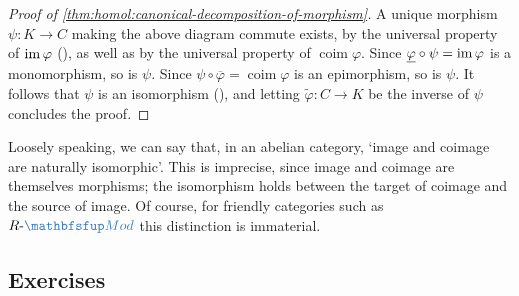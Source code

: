 \begin{proof}[Proof of \cref{thm:homol:canonical-decomposition-of-morphism}]
  A unique morphism $\psi : K \to C$ making the above diagram commute
  exists, by the universal property of $\operatorname{im}\varphi$
  (), as well as by the universal property of
  $\operatorname{coim}\varphi$. Since
  $\underline{\varphi} \circ \psi = \operatorname{im}\varphi$ is a monomorphism,
  so is $\psi$. Since
  $\psi \circ \overline{\varphi} = \operatorname{coim}\varphi$ is an
  epimorphism, so is $\psi$. It follows that $\psi$ is an isomorphism
  (), and letting $\tilde{\varphi} : C \to K$ be
  the inverse of $\psi$ concludes the proof.
\end{proof}
Loosely speaking, we can say that, in an abelian category, `image and
coimage are naturally isomorphic'. This is imprecise, since image and
coimage are themselves morphisms; the isomorphism holds between the
target of coimage and the source of image. Of course, for friendly
categories such as $R\text{-}\categ{Mod}$ this distinction is
immaterial.

\subsection*{Exercises}

